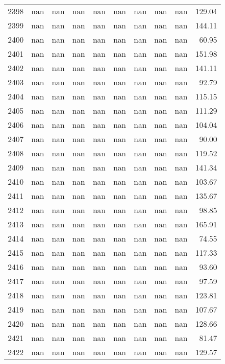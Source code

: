 \begin{tabular}{lrrrrrrrrr}
2398 & nan & nan & nan & nan & nan & nan & nan & nan & 129.04 \\
2399 & nan & nan & nan & nan & nan & nan & nan & nan & 144.11 \\
2400 & nan & nan & nan & nan & nan & nan & nan & nan & 60.95 \\
2401 & nan & nan & nan & nan & nan & nan & nan & nan & 151.98 \\
2402 & nan & nan & nan & nan & nan & nan & nan & nan & 141.11 \\
2403 & nan & nan & nan & nan & nan & nan & nan & nan & 92.79 \\
2404 & nan & nan & nan & nan & nan & nan & nan & nan & 115.15 \\
2405 & nan & nan & nan & nan & nan & nan & nan & nan & 111.29 \\
2406 & nan & nan & nan & nan & nan & nan & nan & nan & 104.04 \\
2407 & nan & nan & nan & nan & nan & nan & nan & nan & 90.00 \\
2408 & nan & nan & nan & nan & nan & nan & nan & nan & 119.52 \\
2409 & nan & nan & nan & nan & nan & nan & nan & nan & 141.34 \\
2410 & nan & nan & nan & nan & nan & nan & nan & nan & 103.67 \\
2411 & nan & nan & nan & nan & nan & nan & nan & nan & 135.67 \\
2412 & nan & nan & nan & nan & nan & nan & nan & nan & 98.85 \\
2413 & nan & nan & nan & nan & nan & nan & nan & nan & 165.91 \\
2414 & nan & nan & nan & nan & nan & nan & nan & nan & 74.55 \\
2415 & nan & nan & nan & nan & nan & nan & nan & nan & 117.33 \\
2416 & nan & nan & nan & nan & nan & nan & nan & nan & 93.60 \\
2417 & nan & nan & nan & nan & nan & nan & nan & nan & 97.59 \\
2418 & nan & nan & nan & nan & nan & nan & nan & nan & 123.81 \\
2419 & nan & nan & nan & nan & nan & nan & nan & nan & 107.67 \\
2420 & nan & nan & nan & nan & nan & nan & nan & nan & 128.66 \\
2421 & nan & nan & nan & nan & nan & nan & nan & nan & 81.47 \\
2422 & nan & nan & nan & nan & nan & nan & nan & nan & 129.57 \\

\end{tabular}
